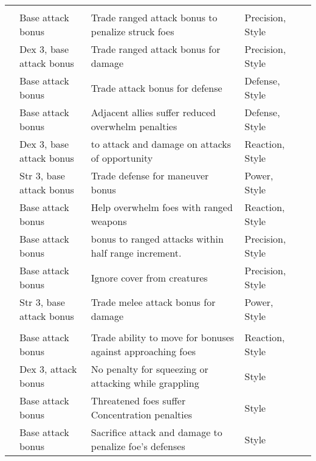 {\small
    \begin{longtabu}{>{\lcol}p{10em} >{\lcol}p{15em} >{\lcol}X >{\lcol}p{6em} >{\lcol}p{3em}}
         &  &  &  &  \\
         & Base attack bonus  & Trade ranged attack bonus to penalize struck foes & Precision, Style &  \\
         & Dex 3, base attack bonus  & Trade ranged attack bonus for damage & Precision, Style &  \\
         & Base attack bonus  & Trade attack bonus for defense & Defense, Style &  \\
         & Base attack bonus  & Adjacent allies suffer reduced overwhelm penalties & Defense, Style &  \\
         & Dex 3, base attack bonus  &  to attack and damage on attacks of opportunity & Reaction, Style &  \\
         & Str 3, base attack bonus  & Trade defense for maneuver bonus & Power, Style &  \\
         & Base attack bonus  & Help overwhelm foes with ranged weapons & Reaction, Style &  \\
         & Base attack bonus  &   bonus to ranged attacks within half range increment. & Precision, Style &  \\
         & Base attack bonus  & Ignore cover from creatures & Precision, Style &  \\
         & Str 3, base attack bonus  & Trade melee attack bonus for damage & Power, Style &  \\

        \midrule
         &  &  &  &  \\
         & Base attack bonus  & Trade ability to move for bonuses against approaching foes & Reaction, Style &  \\
         & Dex 3, attack bonus  & No penalty for squeezing or attacking while grappling & Style &  \\
         & Base attack bonus  & Threatened foes suffer Concentration penalties & Style &  \\
         & Base attack bonus  & Sacrifice attack and damage to penalize foe's defenses & Style &  \\


\end{longtabu}}
